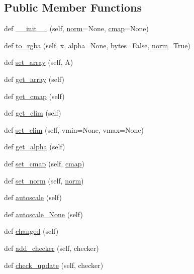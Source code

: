 \subsection*{Public Member Functions}
\begin{DoxyCompactItemize}
\item 
def \hyperlink{classmatplotlib_1_1cm_1_1ScalarMappable_adaafbd301870bb267907a7f748a590ff}{\+\_\+\+\_\+init\+\_\+\+\_\+} (self, \hyperlink{classmatplotlib_1_1cm_1_1ScalarMappable_a5507985e8c38feaa3d6972f75db09f73}{norm}=None, \hyperlink{classmatplotlib_1_1cm_1_1ScalarMappable_a3684ebc12a81cc6f2599c0babd1d40af}{cmap}=None)
\item 
def \hyperlink{classmatplotlib_1_1cm_1_1ScalarMappable_ae1a5e804a3197912a9df293d07b2e272}{to\+\_\+rgba} (self, x, alpha=None, bytes=False, \hyperlink{classmatplotlib_1_1cm_1_1ScalarMappable_a5507985e8c38feaa3d6972f75db09f73}{norm}=True)
\item 
def \hyperlink{classmatplotlib_1_1cm_1_1ScalarMappable_abc8b5ac7556a004691756fa9197f20be}{set\+\_\+array} (self, A)
\item 
def \hyperlink{classmatplotlib_1_1cm_1_1ScalarMappable_a5c6149ee45cc90dfcb737dde4db4e70d}{get\+\_\+array} (self)
\item 
def \hyperlink{classmatplotlib_1_1cm_1_1ScalarMappable_a64acb81e9faf893ea6bd3758367fd4e8}{get\+\_\+cmap} (self)
\item 
def \hyperlink{classmatplotlib_1_1cm_1_1ScalarMappable_a7d44743554ae7c7018cd88612c165ea0}{get\+\_\+clim} (self)
\item 
def \hyperlink{classmatplotlib_1_1cm_1_1ScalarMappable_a2c0eee968e5e43e805db9230c40253d1}{set\+\_\+clim} (self, vmin=None, vmax=None)
\item 
def \hyperlink{classmatplotlib_1_1cm_1_1ScalarMappable_a805fcb0d89197df20b16688b5bd08c8d}{get\+\_\+alpha} (self)
\item 
def \hyperlink{classmatplotlib_1_1cm_1_1ScalarMappable_ab8ef46073dc9cbd74e6b2817dae9bc1d}{set\+\_\+cmap} (self, \hyperlink{classmatplotlib_1_1cm_1_1ScalarMappable_a3684ebc12a81cc6f2599c0babd1d40af}{cmap})
\item 
def \hyperlink{classmatplotlib_1_1cm_1_1ScalarMappable_a855361dd276d7e81483fe7f2785d3361}{set\+\_\+norm} (self, \hyperlink{classmatplotlib_1_1cm_1_1ScalarMappable_a5507985e8c38feaa3d6972f75db09f73}{norm})
\item 
def \hyperlink{classmatplotlib_1_1cm_1_1ScalarMappable_a077e84aff29d91e330cd48faa4325502}{autoscale} (self)
\item 
def \hyperlink{classmatplotlib_1_1cm_1_1ScalarMappable_ae58e300a56fb0c17da9b7e050d1e08ae}{autoscale\+\_\+\+None} (self)
\item 
def \hyperlink{classmatplotlib_1_1cm_1_1ScalarMappable_a53e963849ca2b501fa1a25706fa58207}{changed} (self)
\item 
def \hyperlink{classmatplotlib_1_1cm_1_1ScalarMappable_aff711b5bd3781f1cc62380885c4b8111}{add\+\_\+checker} (self, checker)
\item 
def \hyperlink{classmatplotlib_1_1cm_1_1ScalarMappable_aa84e343fc62897fe6fd5bca60ce3cec8}{check\+\_\+update} (self, checker)
\end{DoxyCompactItemize}
